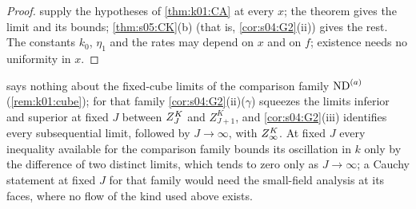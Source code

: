 \begin{proof}
 supply the hypotheses of \cref{thm:k01:CA} at every $x$; the theorem gives the limit and its bounds; \cref{thm:s05:CK}(b) (that is, \cref{cor:s04:G2}(ii)) gives the rest. The constants $k_0$, $\eta_1$ and the rates may depend on $x$ and on $f$; existence needs no uniformity in $x$.
\end{proof}

\begin{remark}\label{rem:k01:compfamily}
 says nothing about the fixed-cube limits of the comparison family $\mathrm{ND}^{(a)}$ (\cref{rem:k01:cube}); for that family \cref{cor:s04:G2}(ii)($\gamma$) squeezes the limits inferior and superior at fixed $J$ between $Z^{K}_{J}$ and $Z^K_{J+1}$, and \cref{cor:s04:G2}(iii) identifies every subsequential limit, followed by $J\to\infty$, with $Z^{K}_{\infty}$. At fixed $J$ every inequality available for the comparison family bounds its oscillation in $k$ only by the difference of two distinct limits, which tends to zero only as $J\to\infty$; a Cauchy statement at fixed $J$ for that family would need the small-field analysis at its faces, where no flow of the kind used above exists.
\end{remark}
